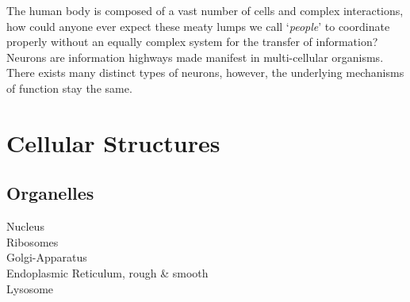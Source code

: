 \documentclass[../../Orator]{subfiles}
\begin{document}


The human body is composed of a vast number of cells and complex interactions, how could anyone ever expect these meaty lumps we call `\textit{people}' to coordinate properly without an equally complex system for the transfer of information? 
Neurons are information highways made manifest in multi-cellular organisms. 
There exists many distinct types of neurons, however, the underlying mechanisms of function stay the same.


\section{Cellular Structures}
\subsection{Organelles}
{\noindent
Nucleus \\
Ribosomes \\
Golgi-Apparatus \\
Endoplasmic Reticulum, rough \& smooth \\
Lysosome
}
\end{document}
